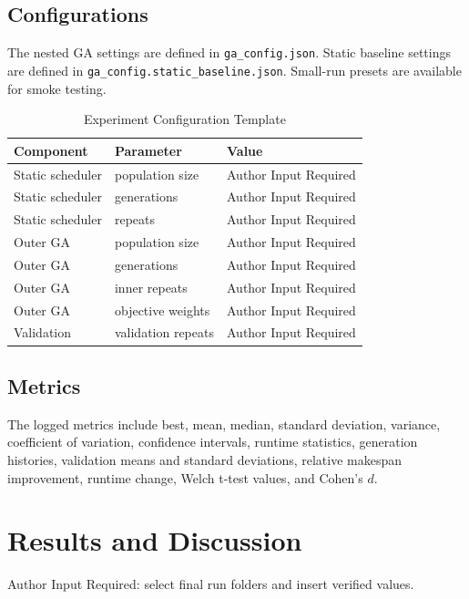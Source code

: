 \documentclass{ieeeaccess}
\begin{document}
\subsection{Configurations}

The nested GA settings are defined in \texttt{ga\_config.json}. Static baseline settings are defined in \texttt{ga\_config.static\_baseline.json}. Small-run presets are available for smoke testing.

\begin{table}[t]
\caption{Experiment Configuration Template}
\label{tab:experiment_config}
\centering
\begin{tabular}{lll}
\toprule
Component & Parameter & Value \\
\midrule
Static scheduler & population size & Author Input Required \\
Static scheduler & generations & Author Input Required \\
Static scheduler & repeats & Author Input Required \\
Outer GA & population size & Author Input Required \\
Outer GA & generations & Author Input Required \\
Outer GA & inner repeats & Author Input Required \\
Outer GA & objective weights & Author Input Required \\
Validation & validation repeats & Author Input Required \\
\bottomrule
\end{tabular}
\end{table}

\subsection{Metrics}

The logged metrics include best, mean, median, standard deviation, variance, coefficient of variation, confidence intervals, runtime statistics, generation histories, validation means and standard deviations, relative makespan improvement, runtime change, Welch t-test values, and Cohen's \(d\).

\section{Results and Discussion}
\label{sec:results}

Author Input Required: select final run folders and insert verified values.
\end{document}
